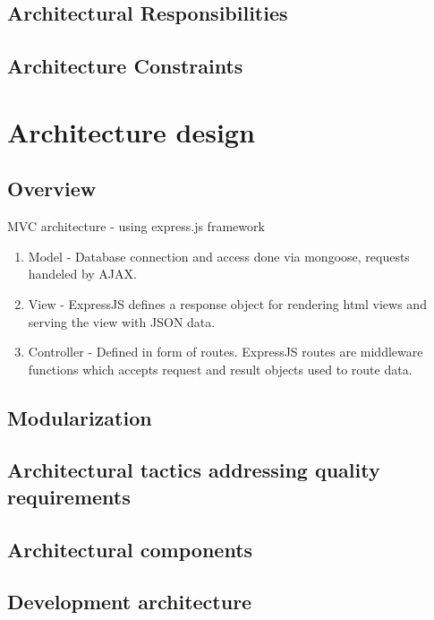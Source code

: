 \documentclass[hidelinks, 12pt, oneside]{article}
\begin{document}
\subsection{Architectural Responsibilities}

\subsection{Architecture Constraints}

\section{Architecture design}
\subsection{Overview}
MVC architecture - using express.js framework
\begin {enumerate}
\item Model - Database connection and access done via mongoose, requests handeled by AJAX.
\item View - ExpressJS defines a response object for rendering html views and serving the view with JSON data.
\item Controller - Defined in form of routes. ExpressJS routes  are middleware functions which accepts request and result objects used to route data.
\end {enumerate}
\subsection{Modularization}

\subsection{Architectural tactics addressing quality requirements}
\subsection{Architectural components} 
\subsection{Development architecture} 
\end{document}
